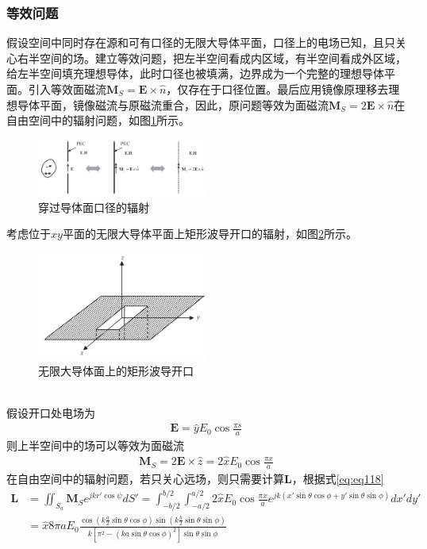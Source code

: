 \documentclass{article}
\numberwithin{equation}{section}
\begin{document}
\subsubsection{等效问题}
假设空间中同时存在源和可有口径的无限大导体平面，口径上的电场已知，且只关心右半空间的场。建立等效问题，把左半空间看成内区域，有半空间看成外区域，给左半空间填充理想导体，此时口径也被填满，边界成为一个完整的理想导体平面。引入等效面磁流$\mathbf{M}_S=\mathbf{E}\times\hat{n}$，仅存在于口径位置。最后应用镜像原理移去理想导体平面，镜像磁流与原磁流重合，因此，原问题等效为面磁流$\mathbf{M}_S=2\mathbf{E}\times\hat{n}$在自由空间中的辐射问题，如图\ref{fig:fig25}所示。
\begin{figure}[ht]
    \centering
    \includegraphics[width=0.5\textwidth]{穿过导体面口径的辐射.PNG}
    \caption{穿过导体面口径的辐射}
    \label{fig:fig25}
\end{figure}
\par
考虑位于$xy$平面的无限大导体平面上矩形波导开口的辐射，如图\ref{fig:fig26}所示。
\begin{figure}[ht]
    \centering
    \includegraphics[width=0.5\textwidth]{无限大导体面上的矩形波导开口.PNG}
    \caption{无限大导体面上的矩形波导开口}
    \label{fig:fig26}
\end{figure}
\\
假设开口处电场为
\begin{align}
    \label{eq:eq251}
    \mathbf{E}=\hat{y}E_0\cos\frac{\pi s}{a}
\end{align}
则上半空间中的场可以等效为面磁流
\begin{align}
    \label{eq:eq252}
    \mathbf{M}_S=2\mathbf{E}\times\hat{z}=2\hat{x}E_0\cos\frac{\pi x}{a}
\end{align}
在自由空间中的辐射问题，若只关心远场，则只需要计算$\mathbf{L}$，根据式\ref{eq:eq118}
\begin{align}
    \label{eq:eq253}
    \mathbf{L}&=\iint_{S_a}\mathbf{M}_Se^{jkr'\cos\psi}dS'=\int_{-b/2}^{b/2}\int_{-a/2}^{a/2}2\hat{x}E_0\cos\frac{\pi x}{a}e^{jk(x'\sin\theta\cos\phi+y'\sin\theta\sin\phi)}dx'dy' \nonumber \\
              &=\hat{x}8\pi aE_0\frac{\cos\left(k\frac{a}{2}\sin\theta\cos\phi\right)\sin\left(k\frac{b}{2}\sin\theta\sin\phi\right)}{k[\pi^2-(ka\sin\theta\cos\phi)^2]\sin\theta\sin\phi}
\end{align}
\end{document}
